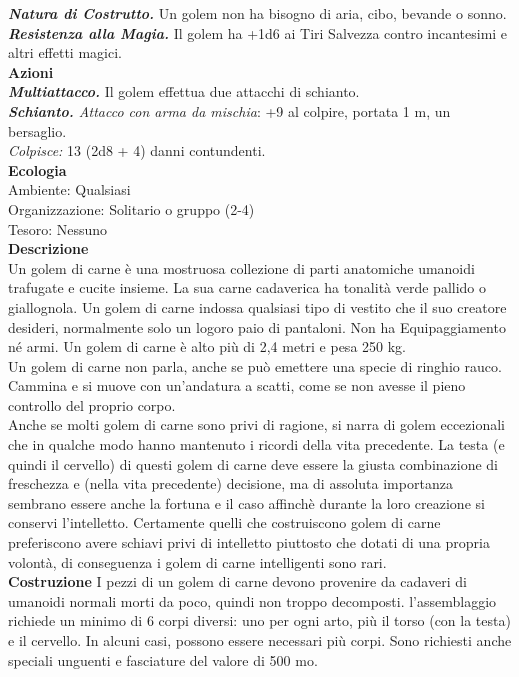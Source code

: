 \begin{multicols}{2}
\emph{\textbf{Natura di Costrutto.}} Un golem non ha bisogno di aria, cibo, bevande o sonno.\\
\emph{\textbf{Resistenza alla Magia.}} Il golem ha +1d6 ai Tiri Salvezza contro incantesimi e altri effetti magici.\\
\smallskip\textbf{Azioni}\\
\emph{\textbf{Multiattacco.}} Il golem effettua due attacchi di schianto.\\
\emph{\textbf{Schianto.} Attacco con arma da mischia}: +9 al colpire, portata 1 m, un bersaglio.\\
\emph{Colpisce:} 13 (2d8 + 4) danni contundenti.\\
\textbf{Ecologia}\\
Ambiente: Qualsiasi\\
Organizzazione: Solitario o gruppo (2-4)\\
Tesoro: Nessuno\\
\textbf{Descrizione}\\
Un golem di carne è una mostruosa collezione di parti anatomiche umanoidi trafugate e cucite insieme. La sua carne cadaverica ha tonalità verde pallido o giallognola. Un golem di carne indossa qualsiasi tipo di vestito che il suo creatore desideri, normalmente solo un logoro paio di pantaloni. Non ha Equipaggiamento né armi. Un golem di carne è alto più di 2,4 metri e pesa 250 kg.\\

Un golem di carne non parla, anche se può emettere una specie di ringhio rauco. Cammina e si muove con un'andatura a scatti, come se non avesse il pieno controllo del proprio corpo.\\

Anche se molti golem di carne sono privi di ragione, si narra di golem eccezionali che in qualche modo hanno mantenuto i ricordi della vita precedente. La testa (e quindi il cervello) di questi golem di carne deve essere la giusta combinazione di freschezza e (nella vita precedente) decisione, ma di assoluta importanza sembrano essere anche la fortuna e il caso affinchè durante la loro creazione si conservi l'intelletto. Certamente quelli che costruiscono golem di carne preferiscono avere schiavi privi di intelletto piuttosto che dotati di una propria volontà, di conseguenza i golem di carne intelligenti sono rari.\\

\textbf{Costruzione}
I pezzi di un golem di carne devono provenire da cadaveri di umanoidi normali morti da poco, quindi non troppo decomposti. l'assemblaggio richiede un minimo di 6 corpi diversi: uno per ogni arto, più il torso (con la testa) e il cervello. In alcuni casi, possono essere necessari più corpi. Sono richiesti anche speciali unguenti e fasciature del valore di 500 mo.\\


\end{multicols}
